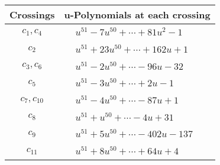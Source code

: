 \documentclass[1p]{elsarticle_modified}
\theoremstyle{definition}
\begin{document}
\begin{tabular}{m{50pt}|m{274pt}}
Crossings & \hspace{64pt}u-Polynomials at each crossing \\
\hline $$\begin{aligned}c_{1},c_{4}\end{aligned}$$&$\begin{aligned}
&u^{51}-7 u^{50}+\cdots+81 u^2-1
\end{aligned}$\\
\hline $$\begin{aligned}c_{2}\end{aligned}$$&$\begin{aligned}
&u^{51}+23 u^{50}+\cdots+162 u+1
\end{aligned}$\\
\hline $$\begin{aligned}c_{3},c_{6}\end{aligned}$$&$\begin{aligned}
&u^{51}-2 u^{50}+\cdots-96 u-32
\end{aligned}$\\
\hline $$\begin{aligned}c_{5}\end{aligned}$$&$\begin{aligned}
&u^{51}-3 u^{50}+\cdots+2 u-1
\end{aligned}$\\
\hline $$\begin{aligned}c_{7},c_{10}\end{aligned}$$&$\begin{aligned}
&u^{51}-4 u^{50}+\cdots-87 u+1
\end{aligned}$\\
\hline $$\begin{aligned}c_{8}\end{aligned}$$&$\begin{aligned}
&u^{51}+u^{50}+\cdots-4 u+31
\end{aligned}$\\
\hline $$\begin{aligned}c_{9}\end{aligned}$$&$\begin{aligned}
&u^{51}+5 u^{50}+\cdots-402 u-137
\end{aligned}$\\
\hline $$\begin{aligned}c_{11}\end{aligned}$$&$\begin{aligned}
&u^{51}+8 u^{50}+\cdots+64 u+4
\end{aligned}$\\
\hline
\end{tabular}\\~\\
\end{document}
